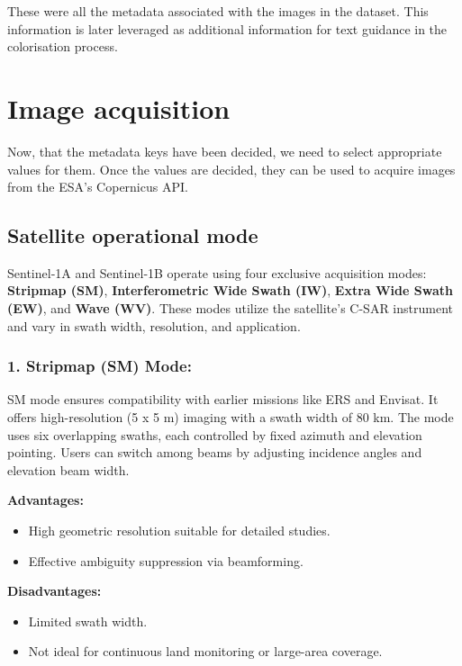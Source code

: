 These were all the metadata associated with the images in the dataset. This information is later leveraged as additional information for text guidance in the colorisation process.

\section{Image acquisition}

Now, that the metadata keys have been decided, we need to select appropriate values for them. Once the values are decided, they can be used to acquire images from the ESA's Copernicus API.

\subsection{Satellite operational mode}

Sentinel‑1A and Sentinel‑1B operate using four exclusive acquisition modes: \textbf{Stripmap (SM)}, \textbf{Interferometric Wide Swath (IW)}, \textbf{Extra Wide Swath (EW)}, and \textbf{Wave (WV)}. These modes utilize the satellite’s C-SAR instrument and vary in swath width, resolution, and application.\cite{eosda2025sentinel1}

\subsubsection{\textbf{1. Stripmap (SM) Mode:}}

SM mode ensures compatibility with earlier missions like ERS and Envisat. It offers high-resolution (5 x 5 m) imaging with a swath width of 80 km. The mode uses six overlapping swaths, each controlled by fixed azimuth and elevation pointing. Users can switch among beams by adjusting incidence angles and elevation beam width.


\textbf{Advantages:}
\begin{itemize}
    \item High geometric resolution suitable for detailed studies.
    \item Effective ambiguity suppression via beamforming.
\end{itemize}

\textbf{Disadvantages:}
\begin{itemize}
    \item Limited swath width.
    \item Not ideal for continuous land monitoring or large-area coverage.
\end{itemize}

